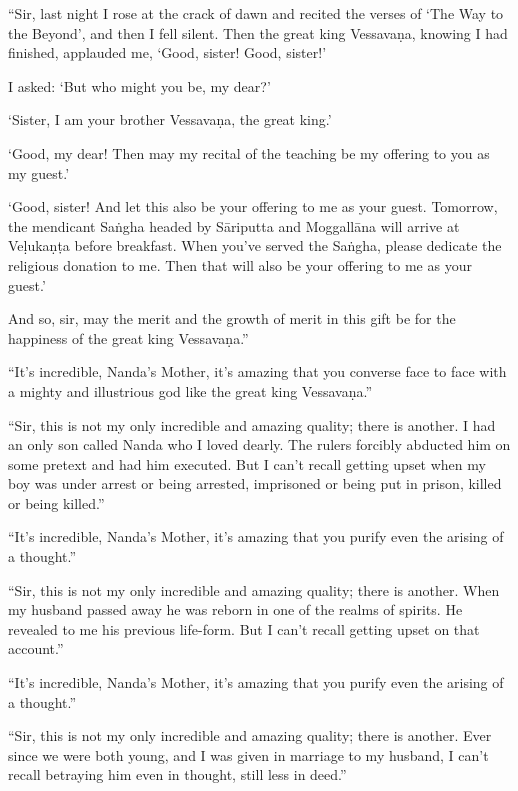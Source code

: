 \documentclass[12pt,openany]{book}%
\begin{document}
“Sir, last night I rose at the crack of dawn and recited the verses of ‘The Way to the Beyond’, and then I fell silent. Then the great king \textsanskrit{Vessavaṇa}, knowing I had finished, applauded me, ‘Good, sister! Good, sister!’ 

I asked: ‘But who might you be, my dear?’ 

‘Sister, I am your brother \textsanskrit{Vessavaṇa}, the great king.’ 

‘Good, my dear! Then may my recital of the teaching be my offering to you as my guest.’ 

‘Good, sister! And let this also be your offering to me as your guest. Tomorrow, the mendicant \textsanskrit{Saṅgha} headed by \textsanskrit{Sāriputta} and \textsanskrit{Moggallāna} will arrive at \textsanskrit{Veḷukaṇṭa} before breakfast. When you’ve served the \textsanskrit{Saṅgha}, please dedicate the religious donation to me. Then that will also be your offering to me as your guest.’ 

And so, sir, may the merit and the growth of merit in this gift be for the happiness of the great king \textsanskrit{Vessavaṇa}.” 

“It’s incredible, Nanda’s Mother, it’s amazing that you converse face to face with a mighty and illustrious god like the great king \textsanskrit{Vessavaṇa}.” 

“Sir, this is not my only incredible and amazing quality; there is another. I had an only son called Nanda who I loved dearly. The rulers forcibly abducted him on some pretext and had him executed. But I can’t recall getting upset when my boy was under arrest or being arrested, imprisoned or being put in prison, killed or being killed.” 

“It’s incredible, Nanda’s Mother, it’s amazing that you purify even the arising of a thought.” 

“Sir, this is not my only incredible and amazing quality; there is another. When my husband passed away he was reborn in one of the realms of spirits. He revealed to me his previous life-form. But I can’t recall getting upset on that account.” 

“It’s incredible, Nanda’s Mother, it’s amazing that you purify even the arising of a thought.” 

“Sir, this is not my only incredible and amazing quality; there is another. Ever since we were both young, and I was given in marriage to my husband, I can’t recall betraying him even in thought, still less in deed.” 
\end{document}
